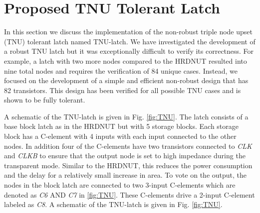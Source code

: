 \section{Proposed TNU Tolerant Latch} \label{sec:TNU}

In this section we discuss the implementation of the non-robust triple node upset (TNU) tolerant latch named TNU-latch. We have investigated the development of a robust TNU latch but it was exceptionally difficult to verify its correctness. For example, a latch with two more nodes compared to the HRDNUT resulted into nine total nodes and requires the verification of 84 unique cases. Instead, we focused on the development of a simple and efficient non-robust design that has 82 transistors. This design has been verified for all possible TNU cases and is shown to be fully tolerant. 

A schematic of the TNU-latch is given in Fig. \ref{fig:TNU}. The latch consists of a base block latch as in the HRDNUT but with 5 storage blocks. Each storage block has a C-element with 4 inputs with each input connected to the other nodes. In addition four of the C-elements have two transistors connected to \textit{CLK} and \textit{CLKB} to ensure that the output node is set to high impedance during the transparent mode. Similar to the HRDNUT, this reduces the power consumption and the delay for a relatively small increase in area. To vote on the output, the nodes in the block latch are connected to two 3-input C-elements which are denoted as \textit{C6} AND \textit{C7} in \ref{fig:TNU}. These C-elements drive a 2-input C-element labeled as \textit{C8}. A schematic of the TNU-latch is given in Fig. \ref{fig:TNU}.


